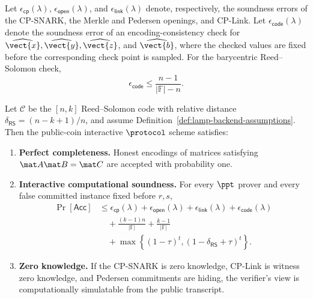 \begin{revblock}
\begin{definition}
\label{def:lamp-backend-assumptions}
Let \(\epsilon_{\mathsf{cp}}(\lambda)\),
\(\epsilon_{\mathsf{open}}(\lambda)\), and
\(\epsilon_{\mathsf{link}}(\lambda)\) denote, respectively, the soundness
errors of the CP-SNARK, the Merkle and Pedersen openings, and CP-Link. Let \(\epsilon_{\mathsf{code}}(\lambda)\) denote the soundness error of an
  encoding-consistency check for
  \(\widehat{\vect{x}},\widehat{\vect{y}},\widehat{\vect{z}}\), and
  \(\widehat{\vect{b}}\), where the checked values are fixed before the
  corresponding check point is sampled. For the barycentric Reed--Solomon check,
  \[
  \epsilon_{\mathsf{code}}
  \leq \frac{n-1}{|\mathbb{F}|-n}.
  \]
\end{definition}

\begin{theorem}
\label{thm:security}
Let \(\mathcal C\) be the \([n,k]\) Reed--Solomon code with relative distance
\(\delta_{\mathsf{RS}}=(n-k+1)/n\), and assume
Definition~\ref{def:lamp-backend-assumptions}.  Then the public-coin interactive
\(\protocol\) scheme satisfies:
\begin{enumerate}[label=(\roman*)]
  \item \textbf{Perfect completeness.}
  Honest encodings of matrices satisfying
  \(\mat A\mat B=\mat C\) are accepted with probability one.

  \item \textbf{Interactive computational soundness.}
  For every \(\ppt\) prover and every false committed instance fixed before
  \(r,s\),
  \[
  \begin{aligned}
  \Pr[\mathsf{Acc}]
  &\le
    \epsilon_{\mathsf{cp}}(\lambda)
   +\epsilon_{\mathsf{open}}(\lambda)
   +\epsilon_{\mathsf{link}}(\lambda)
   +\epsilon_{\mathsf{code}}(\lambda)\\
  &\quad
   +\frac{(k-1)n}{|\mathbb F|}
   +\frac{k-1}{|\mathbb F|}\\
  &\quad
   +\max\!\left\{
      (1-\tau)^t,
      (1-\delta_{\mathsf{RS}}+\tau)^t
    \right\}.
  \end{aligned}
  \]

  \item \textbf{Zero knowledge.}
  If the CP-SNARK is zero knowledge, CP-Link is witness zero knowledge, and
  Pedersen commitments are hiding, the verifier's view is computationally
  simulatable from the public transcript.
\end{enumerate}
\end{theorem}


\end{revblock}

